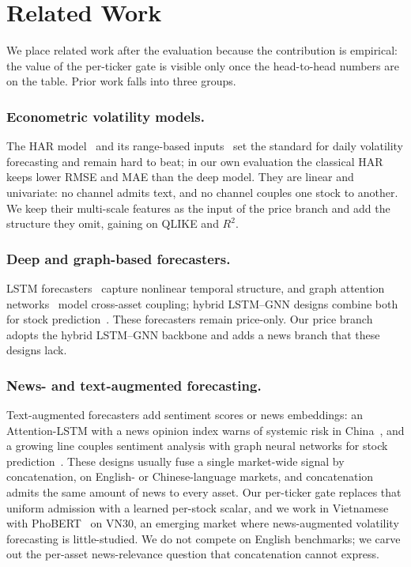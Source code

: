 \documentclass[runningheads]{llncs}
\begin{document}
\section{Related Work}
\label{sec:related}

We place related work after the evaluation because the contribution is empirical: the value of the
per-ticker gate is visible only once the head-to-head numbers are on the table. Prior work falls
into three groups.

\subsubsection{Econometric volatility models.}
The HAR model~\cite{corsi2009} and its range-based inputs~\cite{parkinson1980} set the standard for
daily volatility forecasting and remain hard to beat; in our own evaluation the classical HAR keeps
lower RMSE and MAE than the deep model. They are linear and univariate: no channel admits text, and
no channel couples one stock to another. We keep their multi-scale features as the input of the
price branch and add the structure they omit, gaining on QLIKE and $R^2$.

\subsubsection{Deep and graph-based forecasters.}
LSTM forecasters~\cite{hochreiter1997} capture nonlinear temporal structure, and graph attention
networks~\cite{velickovic2018} model cross-asset coupling; hybrid LSTM--GNN designs combine both for
stock prediction~\cite{sonani2025}. These forecasters remain price-only. Our price branch adopts the
hybrid LSTM--GNN backbone and adds a news branch that these designs lack.

\subsubsection{News- and text-augmented forecasting.}
Text-augmented forecasters add sentiment scores or news embeddings: an Attention-LSTM with a news
opinion index warns of systemic risk in China~\cite{ouyang2021}, and a growing line couples
sentiment analysis with graph neural networks for stock prediction~\cite{das2024}. These designs
usually fuse a single market-wide signal by concatenation, on English- or Chinese-language markets,
and concatenation admits the same amount of news to every asset. Our per-ticker gate replaces that
uniform admission with a learned per-stock scalar, and we work in Vietnamese with
PhoBERT~\cite{phobert2020} on VN30, an emerging market where news-augmented volatility forecasting
is little-studied. We do not compete on English benchmarks; we carve out the per-asset
news-relevance question that concatenation cannot express.
\end{document}
